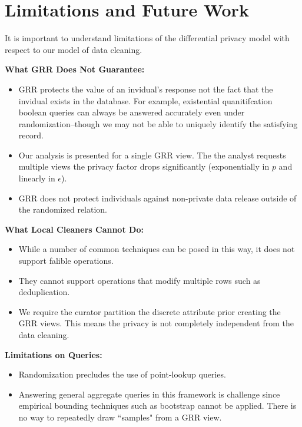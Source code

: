 \section{Limitations and Future Work}
It is important to understand limitations of the differential privacy model with respect to our model of data cleaning.

\vspace{0.5em}

\noindent \textbf{What GRR Does Not Guarantee: }
\begin{itemize}
\item GRR protects the value of an invidual's response not the fact that the invidual exists in the database. For example, existential quanitifcation boolean queries can always be answered accurately even under randomization--though we may not be able to uniquely identify the satisfying record.
\item Our analysis is presented for a single GRR view. The the analyst requests multiple views the privacy factor drops significantly (exponentially in $p$ and linearly in $\epsilon$).
\item GRR does not protect individuals against non-private data release outside of the randomized relation.
\end{itemize}

\vspace{0.5em}

\noindent \textbf{What Local Cleaners Cannot Do: }
\begin{itemize}
\item While a number of common techniques can be posed in this way, it does not support falible operations.
\item They cannot support operations that modify multiple rows such as deduplication.
\item We require the curator partition the discrete attribute prior creating the GRR views. This means the privacy is not completely independent from the data cleaning.
\end{itemize}

\vspace{0.5em}

\noindent \textbf{Limitations on Queries: }
\begin{itemize}
\item Randomization precludes the use of point-lookup queries.
\item Answering general aggregate queries in this framework is challenge since empirical bounding techniques such as bootstrap cannot be applied. There is no way to repeatedly draw ``samples" from a GRR view.
\end{itemize}

